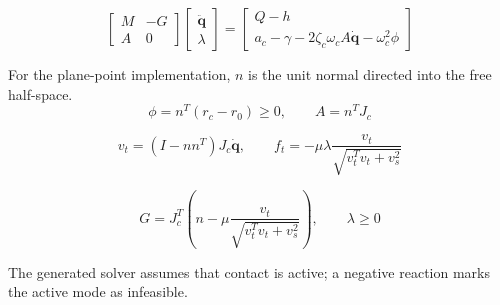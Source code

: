 \documentclass[11pt]{article}
\begin{document}
\begin{equation}
\begin{bmatrix}M&-G\\A&0\end{bmatrix}\begin{bmatrix}\ddot{\boldsymbol q}\\\lambda\end{bmatrix}=\begin{bmatrix}Q-h\\a_c-\gamma-2\zeta_c\omega_cA\dot{\boldsymbol q}-\omega_c^2\phi\end{bmatrix}
\end{equation}

For the plane-point implementation, $n$ is the unit normal directed into the free half-space.
\begin{equation}
\phi=n^T(r_c-r_0)\ge0,\qquad A=n^TJ_c
\end{equation}

\begin{equation}
v_t=(I-nn^T)J_c\dot{\boldsymbol q},\qquad f_t=-\mu\lambda\frac{v_t}{\sqrt{v_t^Tv_t+v_s^2}}
\end{equation}

\begin{equation}
G=J_c^T\left(n-\mu\frac{v_t}{\sqrt{v_t^Tv_t+v_s^2}}\right),\qquad\lambda\ge0
\end{equation}

The generated solver assumes that contact is active; a negative reaction marks the active mode as infeasible.
\end{document}
